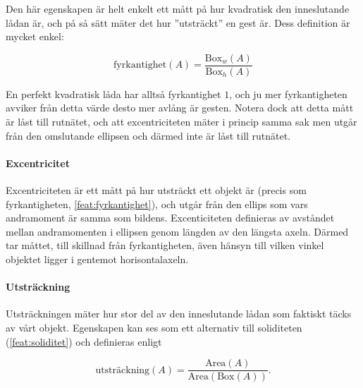 \documentclass[../rapport_MVEX01-11-05]{subfiles}
\begin{document}
Den här egenskapen är helt enkelt ett mått på hur kvadratisk den
inneslutande lådan är, och på så sätt mäter det hur ''utsträckt'' en
gest är. Dess definition är mycket enkel:

\begin{equation*}
  \textrm{fyrkantighet}(A) = \frac{\textrm{Box}_w(A)}{\textrm{Box}_h(A)}
\end{equation*}

En perfekt kvadratisk låda har alltså fyrkantighet $1$, och ju mer
fyrkantigheten avviker från detta värde desto mer avlång är gesten.
Notera dock att detta mått är låst till rutnätet, och att
excentriciteten mäter i princip samma sak men utgår från den
omslutande ellipsen och därmed inte är låst till rutnätet.

\paragraph{Excentricitet}

Excentriciteten är ett mått på hur utsträckt ett objekt är (precis som
fyrkantigheten, \ref{feat:fyrkantighet}), och utgår från den ellips som
vars andramoment är samma som bildens. Excenticiteten definieras av avståndet
mellan andramomenten i ellipsen genom längden av den längsta axeln. Därmed
tar måttet, till skillnad från fyrkantigheten, även hänsyn till vilken vinkel
objektet ligger i gentemot horisontalaxeln.

\paragraph{Utsträckning}

Utsträckningen mäter hur stor del av den inneslutande lådan som
faktiskt täcks av vårt objekt. Egenskapen kan ses som ett alternativ
till soliditeten (\ref{feat:soliditet}) och definieras enligt

\begin{equation*}
  \textrm{utsträckning}(A) =
  \frac{\textrm{Area}(A)}{\textrm{Area}(\textrm{Box}(A))}.
\end{equation*}
\end{document}

